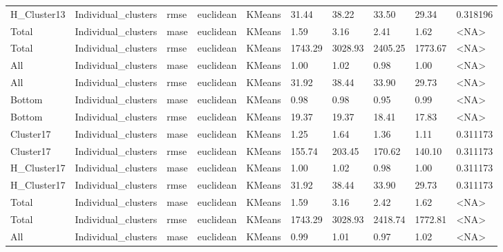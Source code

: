 \begin{tabular}{llllllllll}
H\_Cluster13 & Individual\_clusters &   rmse &  euclidean &        KMeans &   31.44 &    38.22 &                 33.50 &         29.34 &  0.318196 \\
      Total & Individual\_clusters &   mase &  euclidean &        KMeans &    1.59 &     3.16 &                  2.41 &          1.62 &      <NA> \\
      Total & Individual\_clusters &   rmse &  euclidean &        KMeans & 1743.29 &  3028.93 &               2405.25 &       1773.67 &      <NA> \\
        All & Individual\_clusters &   mase &  euclidean &        KMeans &    1.00 &     1.02 &                  0.98 &          1.00 &      <NA> \\
        All & Individual\_clusters &   rmse &  euclidean &        KMeans &   31.92 &    38.44 &                 33.90 &         29.73 &      <NA> \\
     Bottom & Individual\_clusters &   mase &  euclidean &        KMeans &    0.98 &     0.98 &                  0.95 &          0.99 &      <NA> \\
     Bottom & Individual\_clusters &   rmse &  euclidean &        KMeans &   19.37 &    19.37 &                 18.41 &         17.83 &      <NA> \\
  Cluster17 & Individual\_clusters &   mase &  euclidean &        KMeans &    1.25 &     1.64 &                  1.36 &          1.11 &  0.311173 \\
  Cluster17 & Individual\_clusters &   rmse &  euclidean &        KMeans &  155.74 &   203.45 &                170.62 &        140.10 &  0.311173 \\
H\_Cluster17 & Individual\_clusters &   mase &  euclidean &        KMeans &    1.00 &     1.02 &                  0.98 &          1.00 &  0.311173 \\
H\_Cluster17 & Individual\_clusters &   rmse &  euclidean &        KMeans &   31.92 &    38.44 &                 33.90 &         29.73 &  0.311173 \\
      Total & Individual\_clusters &   mase &  euclidean &        KMeans &    1.59 &     3.16 &                  2.42 &          1.62 &      <NA> \\
      Total & Individual\_clusters &   rmse &  euclidean &        KMeans & 1743.29 &  3028.93 &               2418.74 &       1772.81 &      <NA> \\
        All & Individual\_clusters &   mase &  euclidean &        KMeans &    0.99 &     1.01 &                  0.97 &          1.02 &      <NA> \\

\end{tabular}
